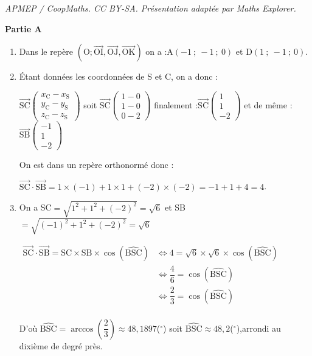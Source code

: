 \documentclass[10pt]{article}
\providecommand{\vectt}[1]{\overrightarrow{\mathrm{#1}}}
\begin{document}
\noindent\textit{APMEP / CoopMaths. CC BY-SA. Présentation adaptée par Maths Explorer.}\par\medskip
\textbf{Partie A}

\begin{enumerate}
\item 

Dans le repère $\left(\mathrm{O}; \vectt{OI}, \vectt{OJ}, \vectt{OK}\right)$ on a :\quad A$(-1~;~-1~;~0)$ \quad et \quad D$(1~;~-1~;~0)$.

\item Étant données les coordonnées de S et C, on a donc :

$\vectt{SC}\begin{pmatrix}	x_\mathrm{C}-x_\mathrm{S} \\ y_\mathrm{C}-y_\mathrm{S}\\ z_\mathrm{C}-z_\mathrm{S} \end{pmatrix}$ \quad soit \quad $\vectt{SC}\begin{pmatrix}	1-0 \\ 1-0\\ 0-2 \end{pmatrix}$ \quad finalement :\quad $\vectt{SC}\begin{pmatrix}	1 \\1\\-2 \end{pmatrix}$
\quad et de même :\quad $\vectt{SB}\begin{pmatrix}	-1 \\1\\-2 \end{pmatrix}$

On est dans un repère orthonormé donc :

$\vectt{SC}\cdot\vectt{SB}= 1 \times (-1) + 1 \times 1 + (-2) \times (-2) = -1 +1+4=4$.

\item On a SC$=\sqrt{ 1^2+1^2+(-2)^2} = \sqrt{6}$ \quad et \quad SB$=\sqrt{ (-1)^2+1^2+(-2)^2} = \sqrt{6}$

$	\begin{aligned} \vectt{SC}\cdot\vectt{SB} = \mathrm{SC} \times \mathrm{SB} \times \cos\left(\widehat{\mathrm{BSC}}\right) & \iff 4 = \sqrt{6} \times \sqrt{6} \times \cos\left(\widehat{\mathrm{BSC}}\right) \\
			& \iff \dfrac{4}{6} = \cos\left(\widehat{\mathrm{BSC}}\right) \\
				& \iff \dfrac{2}{3} = \cos\left(\widehat{\mathrm{BSC}}\right) \\
			\end{aligned} $

	D'où \quad $\widehat{\mathrm{BSC}} = \arccos\left(\dfrac{2}{3}\right) \approx 48,1897$(\ensuremath{^\circ}) \quad soit \quad $\widehat{\mathrm{BSC}} \approx 48,2 $(\ensuremath{^\circ}),\quad arrondi au dixième de degré près.
	\end{enumerate}
\end{document}
